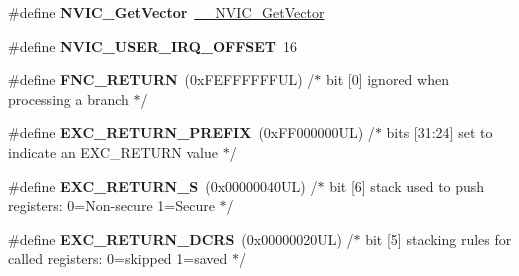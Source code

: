 \begin{DoxyCompactItemize}
\item 
\mbox{\label{group___c_m_s_i_s___core___n_v_i_c_functions_ga955eb1c33a3dcc62af11a8385e8c0fc8}} 
\#define {\bfseries N\+V\+I\+C\+\_\+\+Get\+Vector}~\mbox{\hyperlink{group___c_m_s_i_s___core___n_v_i_c_functions_ga44b665d2afb708121d9b10c76ff00ee5}{\+\_\+\+\_\+\+N\+V\+I\+C\+\_\+\+Get\+Vector}}
\item 
\mbox{\label{group___c_m_s_i_s___core___n_v_i_c_functions_ga8045d905a5ca57437d8e6f71ffcb6df5}} 
\#define {\bfseries N\+V\+I\+C\+\_\+\+U\+S\+E\+R\+\_\+\+I\+R\+Q\+\_\+\+O\+F\+F\+S\+ET}~16
\item 
\mbox{\label{group___c_m_s_i_s___core___n_v_i_c_functions_gabaa62910bf89acc186ae998c611e64ab}} 
\#define {\bfseries F\+N\+C\+\_\+\+R\+E\+T\+U\+RN}~(0x\+F\+E\+F\+F\+F\+F\+F\+F\+U\+L)     /$\ast$ bit \mbox{[}0\mbox{]} ignored when processing a branch                             $\ast$/
\item 
\mbox{\label{group___c_m_s_i_s___core___n_v_i_c_functions_ga99e0c1c19f050880a8bd827a7f420bec}} 
\#define {\bfseries E\+X\+C\+\_\+\+R\+E\+T\+U\+R\+N\+\_\+\+P\+R\+E\+F\+IX}~(0x\+F\+F000000\+U\+L)     /$\ast$ bits \mbox{[}31\+:24\mbox{]} set to indicate an E\+X\+C\+\_\+\+R\+E\+T\+U\+R\+N value                     $\ast$/
\item 
\mbox{\label{group___c_m_s_i_s___core___n_v_i_c_functions_ga88711355d0196b1ffeb18c33e2c95360}} 
\#define {\bfseries E\+X\+C\+\_\+\+R\+E\+T\+U\+R\+N\+\_\+S}~(0x00000040\+U\+L)     /$\ast$ bit \mbox{[}6\mbox{]} stack used to push registers\+: 0=\+Non-\/secure 1=\+Secure          $\ast$/
\item 
\mbox{\label{group___c_m_s_i_s___core___n_v_i_c_functions_ga0a0f2c03b4aef2c02bdae044bda1324b}} 
\#define {\bfseries E\+X\+C\+\_\+\+R\+E\+T\+U\+R\+N\+\_\+\+D\+C\+RS}~(0x00000020\+U\+L)     /$\ast$ bit \mbox{[}5\mbox{]} stacking rules for called registers\+: 0=skipped 1=saved       $\ast$/
\item 
\mbox{\label{group___c_m_s_i_s___core___n_v_i_c_functions_ga342b51c3eec59822bf206e24ef881a9e}} 

\end{DoxyCompactItemize}

